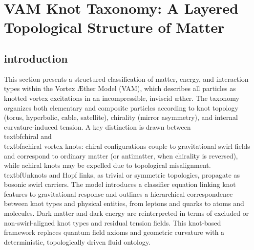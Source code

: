 \section{VAM Knot Taxonomy: A Layered Topological Structure of Matter}
\label{sec:knot-taxonomy}

\subsection*{introduction}
This section presents a structured classification of matter, energy, and interaction types within the Vortex \AE{}ther Model (VAM), which describes all particles as knotted vortex excitations in an incompressible, inviscid \ae{}ther. The taxonomy organizes both elementary and composite particles according to knot topology (torus, hyperbolic, cable, satellite), chirality (mirror asymmetry), and internal curvature-induced tension. A key distinction is drawn between \\textbf{chiral} and \\textbf{achiral} vortex knots: chiral configurations couple to gravitational swirl fields and correspond to ordinary matter (or antimatter, when chirality is reversed), while achiral knots may be expelled due to topological misalignment. \\textbf{Unknots and Hopf links}, as trivial or symmetric topologies, propagate as bosonic swirl carriers. The model introduces a classifier equation linking knot features to gravitational response and outlines a hierarchical correspondence between knot types and physical entities, from leptons and quarks to atoms and molecules. Dark matter and dark energy are reinterpreted in terms of excluded or non-swirl-aligned knot types and residual tension fields. This knot-based framework replaces quantum field axioms and geometric curvature with a deterministic, topologically driven fluid ontology.


